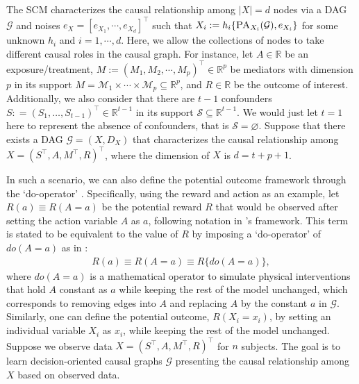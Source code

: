 The \acrfull{SCM} characterizes the causal relationship among $|{X}|=d$ nodes via a DAG $\mathcal{G}$ and noises ${e}_{{X}} = [e_{X_1},\cdots,e_{X_d}]^\top$ such that
$X_i := h_i\{\textsc{PA}_{X_i} (\mathcal{G}), e_{X_i}\}$ for some unknown $h_i$ and $i=1,\cdots,d$. Here, we allow the collections of nodes to take different causal roles in the causal graph. For instance, let $A \in \mathbb{R}$ be an exposure/treatment, $M := (M_1,M_2,\cdots,M_p)^{\top} \in \mathbb{R}^p$ be mediators with dimension $p$ in its support ${M} = \mathcal{M}_1 \times \cdots \times \mathcal{M}_p \subseteq \mathbb{R}^p$, and $R \in \mathbb{R}$ be the outcome of interest. Additionally, we also consider that there are $t - 1$ confounders ${S}: = (S_1, \ldots, S_{t - 1})^{\top} \in \mathbb{R}^{t - 1}$ in its support $\mathcal{S} \subseteq \mathbb{R}^{t - 1}$. We would just let $t = 1$ here to represent the absence of confounders, that is $\mathcal{S} = \varnothing$. Suppose that there exists a \acrshort{DAG} $\mathcal{G} =({X},{D}_{{X}})$ that characterizes the causal relationship among ${X}=({S}^{\top}, A, {M}^\top, R)^\top$, where the dimension of ${X}$ is $d = t + p + 1$. 

In such a scenario, we can also define the potential outcome framework \citep{rubin1978bayesian} through the `do-operator' \citep{pearl2000causality}. Specifically, using the reward and action as an example, let $R(a)\equiv R(A=a)$ be the potential reward $R$ that would be observed after setting the action variable $A$ as $a$, following notation in \citet{rubin1978bayesian}'s framework. This term is stated to be equivalent to the value of $R$ by imposing a `do-operator' of $do(A=a)$ as in \citet{pearl2009causal}:
\begin{eqnarray*}
    R(a)\equiv R(A=a)\equiv R\{do(A=a)\},
\end{eqnarray*}
where $do(A=a)$ is a mathematical operator to simulate physical interventions that hold $A$ constant as $a$ while keeping the rest of the model unchanged, which corresponds to removing edges into $A$ and replacing $A$ by the constant $a$ in $\mathcal{G}$. 
Similarly, one can define the potential outcome,  $R(X_i=x_i)$, by setting an individual variable $X_i$ as $x_i$, while keeping the rest of the model unchanged.  
Suppose we observe data  ${X} = ({S}^{\top}, A, {M}^\top, R)^\top$ for $n$ subjects. The goal is to learn decision-oriented causal graphs $\mathcal{G}$ presenting the causal relationship among ${X}$ based on observed data.



